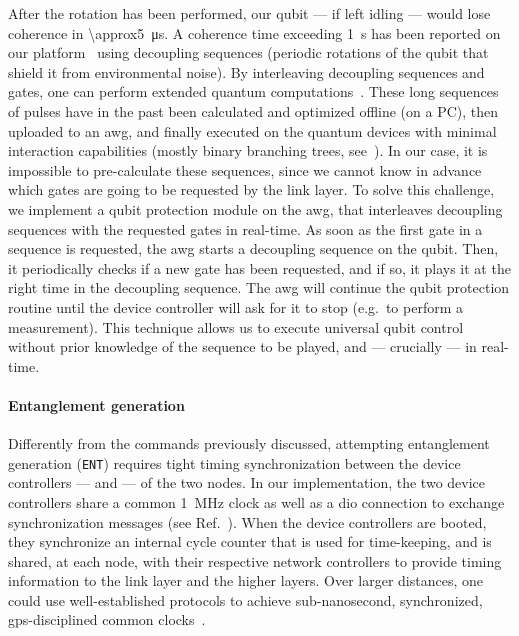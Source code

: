 After the rotation has been performed, our qubit --- if left idling --- would lose coherence in
\qty{\approx5}{\us}. A coherence time exceeding \qty{1}{s} has been reported on our
platform~\cite{abobeih_2018_one_sec} using decoupling sequences (periodic rotations of the qubit
that shield it from environmental noise). By interleaving decoupling sequences and gates, one can
perform extended quantum computations~\cite{bradley_2019_one_min}. These long sequences of pulses
have in the past been calculated and optimized offline (on a PC), then uploaded to an
\acrshort{awg}, and finally executed on the quantum devices with minimal interaction capabilities
(mostly binary branching trees, see~\cite{pompili_2021_multinode}). In our case, it is impossible to
pre-calculate these sequences, since we cannot know in advance which gates are going to be requested
by the link layer. To solve this challenge, we implement a {qubit protection} module on the
\acrshort{awg}, that interleaves decoupling sequences with the requested gates in real-time. As soon
as the first gate in a sequence is requested, the \acrshort{awg} starts a decoupling sequence on the
qubit. Then, it periodically checks if a new gate has been requested, and if so, it plays it at the
right time in the decoupling sequence. The \acrshort{awg} will continue the qubit protection routine
until the device controller will ask for it to stop (e.g.~to perform a measurement). This technique
allows us to execute universal qubit control without prior knowledge of the sequence to be played,
and --- crucially --- in real-time.

\paragraph{Entanglement generation}

Differently from the commands previously discussed, attempting entanglement generation
(\texttt{ENT}) requires tight timing synchronization between the device controllers --- and
 --- of the two nodes. In our implementation, the two device controllers share a
common \qty{1}{MHz} clock as well as a \acrshort{dio} connection to exchange synchronization
messages (see Ref.~\cite{pompili_2021_multinode}). When the device controllers are booted, they
synchronize an internal cycle counter that is used for time-keeping, and is shared, at each node,
with their respective network controllers to provide timing information to the link layer and the
higher layers. Over larger distances, one could use well-established protocols to achieve
sub-nanosecond, synchronized, \acrshort{gps}-disciplined common clocks~\cite{whiterabbit}.

